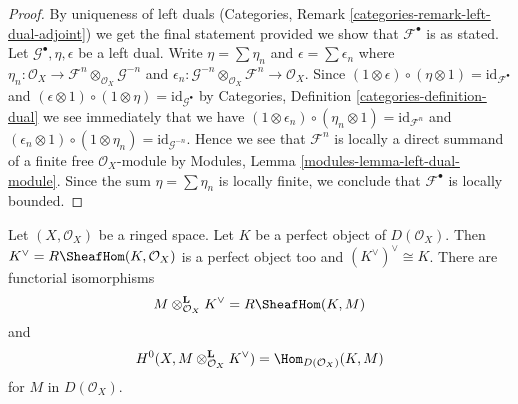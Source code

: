 \begin{proof}
By uniqueness of left duals
(Categories, Remark \ref{categories-remark-left-dual-adjoint})
we get the final statement provided we show that $\mathcal{F}^\bullet$
is as stated. Let $\mathcal{G}^\bullet, \eta, \epsilon$ be a left dual.
Write $\eta = \sum \eta_n$ and $\epsilon = \sum \epsilon_n$
where $\eta_n : \mathcal{O}_X \to
\mathcal{F}^n \otimes_{\mathcal{O}_X} \mathcal{G}^{-n}$
and
$\epsilon_n : \mathcal{G}^{-n} \otimes_{\mathcal{O}_X} \mathcal{F}^n
\to \mathcal{O}_X$. Since
$(1 \otimes \epsilon) \circ (\eta \otimes 1) = \text{id}_{\mathcal{F}^\bullet}$
and
$(\epsilon \otimes 1) \circ (1 \otimes \eta) = \text{id}_{\mathcal{G}^\bullet}$
by Categories, Definition \ref{categories-definition-dual} we see immediately
that we have
$(1 \otimes \epsilon_n) \circ (\eta_n \otimes 1) = \text{id}_{\mathcal{F}^n}$
and
$(\epsilon_n \otimes 1) \circ (1 \otimes \eta_n) =
\text{id}_{\mathcal{G}^{-n}}$.
Hence we see that $\mathcal{F}^n$ is locally a direct summand of a finite
free $\mathcal{O}_X$-module by
Modules, Lemma \ref{modules-lemma-left-dual-module}.
Since the sum $\eta = \sum \eta_n$ is locally finite, we conclude that
$\mathcal{F}^\bullet$ is locally bounded.
\end{proof}

\begin{lemma}
\label{lemma-dual-perfect-complex}
Let $(X, \mathcal{O}_X)$ be a ringed space. Let $K$ be a perfect object of
$D(\mathcal{O}_X)$. Then $K^\vee = R\SheafHom(K, \mathcal{O}_X)$ is a
perfect object too and $(K^\vee)^\vee \cong K$. There are
functorial isomorphisms
$$
M \otimes^\mathbf{L}_{\mathcal{O}_X} K^\vee = R\SheafHom(K, M)
$$
and
$$
H^0(X, M \otimes^\mathbf{L}_{\mathcal{O}_X} K^\vee) =
\Hom_{D(\mathcal{O}_X)}(K, M)
$$
for $M$ in $D(\mathcal{O}_X)$.
\end{lemma}

